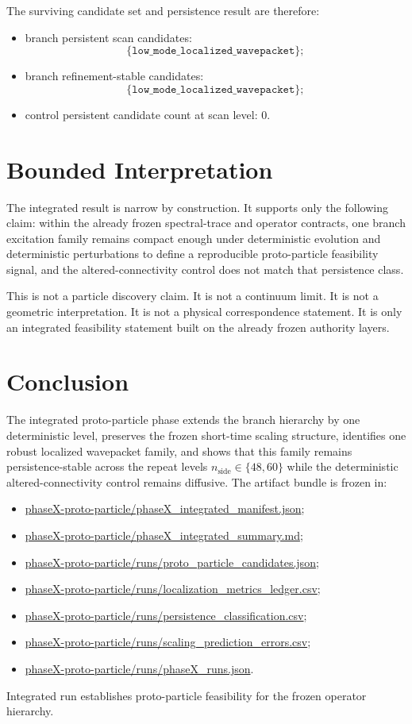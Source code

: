 \documentclass[11pt]{article}
\begin{document}
The surviving candidate set and persistence result are therefore:
\begin{itemize}
\item branch persistent scan candidates:
\[
\{\texttt{low\_mode\_localized\_wavepacket}\};
\]
\item branch refinement-stable candidates:
\[
\{\texttt{low\_mode\_localized\_wavepacket}\};
\]
\item control persistent candidate count at scan level: $0$.
\end{itemize}

\section{Bounded Interpretation}

The integrated result is narrow by construction. It supports only the following claim: within the already frozen spectral-trace and operator contracts, one branch excitation family remains compact enough under deterministic evolution and deterministic perturbations to define a reproducible proto-particle feasibility signal, and the altered-connectivity control does not match that persistence class.

This is not a particle discovery claim. It is not a continuum limit. It is not a geometric interpretation. It is not a physical correspondence statement. It is only an integrated feasibility statement built on the already frozen authority layers.

\section{Conclusion}

The integrated proto-particle phase extends the branch hierarchy by one deterministic level, preserves the frozen short-time scaling structure, identifies one robust localized wavepacket family, and shows that this family remains persistence-stable across the repeat levels $n_{\mathrm{side}} \in \{48,60\}$ while the deterministic altered-connectivity control remains diffusive. The artifact bundle is frozen in:
\begin{itemize}
\item \url{phaseX-proto-particle/phaseX_integrated_manifest.json};
\item \url{phaseX-proto-particle/phaseX_integrated_summary.md};
\item \url{phaseX-proto-particle/runs/proto_particle_candidates.json};
\item \url{phaseX-proto-particle/runs/localization_metrics_ledger.csv};
\item \url{phaseX-proto-particle/runs/persistence_classification.csv};
\item \url{phaseX-proto-particle/runs/scaling_prediction_errors.csv};
\item \url{phaseX-proto-particle/runs/phaseX_runs.json}.
\end{itemize}

Integrated run establishes proto-particle feasibility for the frozen operator hierarchy.
\end{document}
